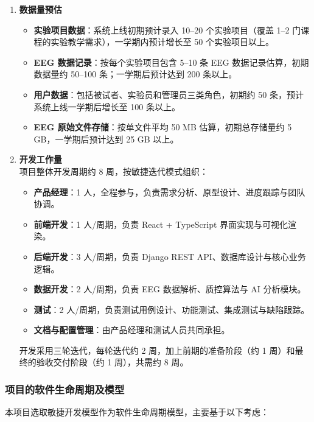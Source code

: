 \begin{enumerate}[(1)]
  \item \textbf{数据量预估}
    \begin{itemize}
      \item \textbf{实验项目数据}：系统上线初期预计录入 10--20 个实验项目（覆盖 1--2 门课程的实验教学需求），一学期内预计增长至 50 个实验项目以上。
      \item \textbf{EEG 数据记录}：按每个实验项目包含 5--10 条 EEG 数据记录估算，初期数据量约 50--100 条；一学期后预计达到 200 条以上。
      \item \textbf{用户数据}：包括被试者、实验员和管理员三类角色，初期约 50 条，预计系统上线一学期后增长至 100 条以上。
      \item \textbf{EEG 原始文件存储}：按单文件平均 50 MB 估算，初期总存储量约 5 GB，一学期后预计达到 25 GB 以上。
    \end{itemize}

  \item \textbf{开发工作量}\\
  项目整体开发周期约 8 周，按敏捷迭代模式组织：
    \begin{itemize}
      \item \textbf{产品经理}：1 人，全程参与，负责需求分析、原型设计、进度跟踪与团队协调。
      \item \textbf{前端开发}：1 人/周期，负责 React + TypeScript 界面实现与可视化渲染。
      \item \textbf{后端开发}：3 人/周期，负责 Django REST API、数据库设计与核心业务逻辑。
      \item \textbf{数据开发}：2 人/周期，负责 EEG 数据解析、质控算法与 AI 分析模块。
      \item \textbf{测试}：2 人/周期，负责测试用例设计、功能测试、集成测试与缺陷跟踪。
      \item \textbf{文档与配置管理}：由产品经理和测试人员共同承担。
    \end{itemize}
    开发采用三轮迭代，每轮迭代约 2 周，加上前期的准备阶段（约 1 周）和最终的验收交付阶段（约 1 周），共需约 8 周。
\end{enumerate}

\subsubsection{项目的软件生命周期及模型}

本项目选取敏捷开发模型作为软件生命周期模型，主要基于以下考虑：

